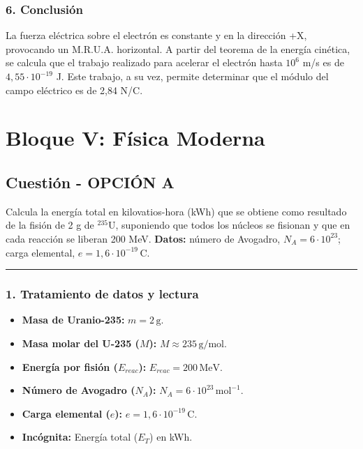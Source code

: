 \subsubsection*{6. Conclusión}
\begin{cajaconclusion}
La fuerza eléctrica sobre el electrón es constante y en la dirección +X, provocando un M.R.U.A. horizontal. A partir del teorema de la energía cinética, se calcula que el trabajo realizado para acelerar el electrón hasta $10^6$ m/s es de $4,55 \cdot 10^{-19}$ J. Este trabajo, a su vez, permite determinar que el módulo del campo eléctrico es de 2,84 N/C.
\end{cajaconclusion}
\newpage

\section{Bloque V: Física Moderna}
\label{sec:moderna_2017_jun_ord}

\subsection{Cuestión - OPCIÓN A}
\label{subsec:B5A_2017_jun_ord}
\begin{cajaenunciado}
Calcula la energía total en kilovatios-hora (kWh) que se obtiene como resultado de la fisión de 2 g de ${}^{235}\text{U}$, suponiendo que todos los núcleos se fisionan y que en cada reacción se liberan 200 MeV.
\textbf{Datos:} número de Avogadro, $N_{A}=6\cdot10^{23}$; carga elemental, $e=1,6\cdot10^{-19}\,\text{C}$.
\end{cajaenunciado}
\hrule

\subsubsection*{1. Tratamiento de datos y lectura}
\begin{itemize}
    \item \textbf{Masa de Uranio-235:} $m = 2\,\text{g}$.
    \item \textbf{Masa molar del U-235 ($M$):} $M \approx 235\,\text{g/mol}$.
    \item \textbf{Energía por fisión ($E_{reac}$):} $E_{reac} = 200\,\text{MeV}$.
    \item \textbf{Número de Avogadro ($N_A$):} $N_A = 6 \cdot 10^{23}\,\text{mol}^{-1}$.
    \item \textbf{Carga elemental ($e$):} $e = 1,6 \cdot 10^{-19}\,\text{C}$.
    \item \textbf{Incógnita:} Energía total ($E_T$) en kWh.
\end{itemize}

